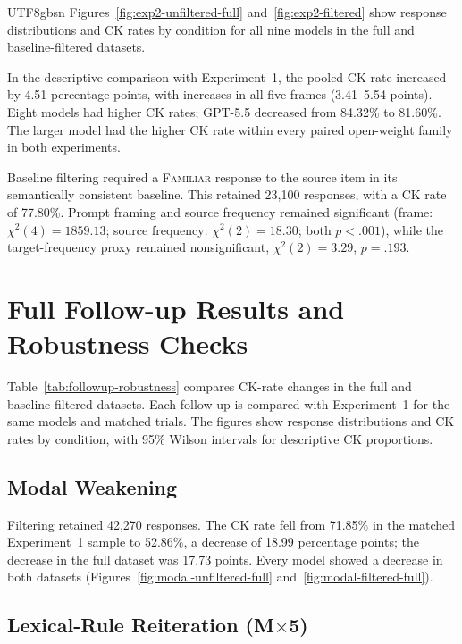 \documentclass[11pt]{article}
\begin{document}
\begin{CJK*}{UTF8}{gbsn}
Figures~\ref{fig:exp2-unfiltered-full} and~\ref{fig:exp2-filtered} show response distributions and CK rates by condition for all nine models in the full and baseline-filtered datasets.

In the descriptive comparison with Experiment~1, the pooled CK rate increased by 4.51 percentage points, with increases in all five frames (3.41--5.54 points). Eight models had higher CK rates; GPT-5.5 decreased from 84.32\% to 81.60\%. The larger model had the higher CK rate within every paired open-weight family in both experiments.

Baseline filtering required a \textsc{Familiar} response to the source item in its semantically consistent baseline. This retained 23,100 responses, with a CK rate of 77.80\%. Prompt framing and source frequency remained significant (frame: $\chi^2(4)=1859.13$; source frequency: $\chi^2(2)=18.30$; both $p<.001$), while the target-frequency proxy remained nonsignificant, $\chi^2(2)=3.29$, $p=.193$.

\section{Full Follow-up Results and Robustness Checks}
\label{app:followup-results}

Table~\ref{tab:followup-robustness} compares CK-rate changes in the full and baseline-filtered datasets. Each follow-up is compared with Experiment~1 for the same models and matched trials. The figures show response distributions and CK rates by condition, with 95\% Wilson intervals for descriptive CK proportions.

\subsection{Modal Weakening}
\label{app:modal-full-results}

Filtering retained 42,270 responses. The CK rate fell from 71.85\% in the matched Experiment~1 sample to 52.86\%, a decrease of 18.99 percentage points; the decrease in the full dataset was 17.73 points. Every model showed a decrease in both datasets (Figures~\ref{fig:modal-unfiltered-full} and~\ref{fig:modal-filtered-full}).

\subsection{Lexical-Rule Reiteration (M$\times$5)}
\label{app:reiteration-full-results}


\end{CJK*}
\end{document}
